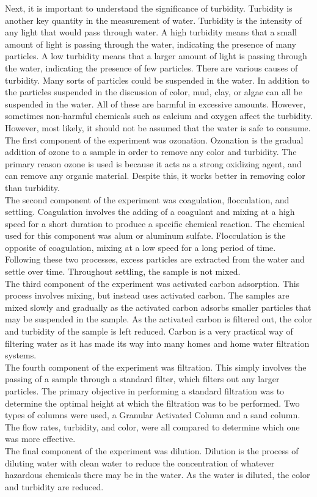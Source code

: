 \documentclass{article}
\begin{document}
    \indent Next, it is important to understand the significance of turbidity. Turbidity is another key quantity in the measurement of water. Turbidity is the intensity of any light that would pass through water. A high turbidity means that a small amount of light is passing through the water, indicating the presence of many particles. A low turbidity means that a larger amount of light is passing through the water, indicating the presence of few particles. There are various causes of turbidity. Many sorts of particles could be suspended in the water. In addition to the particles suspended in the discussion of color, mud, clay, or algae can all be suspended in the water. All of these are harmful in excessive amounts. However, sometimes non-harmful chemicals such as calcium and oxygen affect the turbidity. However, most likely, it should not be assumed that the water is safe to consume.\\
    \indent The first component of the experiment was ozonation. Ozonation is the gradual addition of ozone to a sample in order to remove any color and turbidity. The primary reason ozone is used is because it acts as a strong oxidizing agent, and can remove any organic material. Despite this, it works better in removing color than turbidity.\\
    \indent The second component of the experiment was coagulation, flocculation, and settling. Coagulation involves the adding of a coagulant and mixing at a high speed for a short duration to produce a specific chemical reaction. The chemical used for this component was alum or aluminum sulfate. Flocculation is the opposite of coagulation, mixing at a low speed for a long period of time. Following these two processes, excess particles are extracted from the water and settle over time. Throughout settling, the sample is not mixed.\\
    \indent The third component of the experiment was activated carbon adsorption. This process involves mixing, but instead uses activated carbon. The samples are mixed slowly and gradually as the activated carbon adsorbs smaller particles that may be suspended in the sample. As the activated carbon is filtered out, the color and turbidity of the sample is left reduced. Carbon is a very practical way of filtering water as it has made its way into many homes and home water filtration systems.\\
    \indent The fourth component of the experiment was filtration. This simply involves the passing of a sample through a standard filter, which filters out any larger particles. The primary objective in performing a standard filtration was to determine the optimal height at which the filtration was to be performed. Two types of columns were used, a Granular Activated Column and a sand column. The flow rates, turbidity, and color, were all compared to determine which one was more effective.\\
    \indent The final component of the experiment was dilution. Dilution is the process of diluting water with clean water to reduce the concentration of whatever hazardous chemicals there may be in the water. As the water is diluted, the color and turbidity are reduced.
    \newpage
\end{document}
